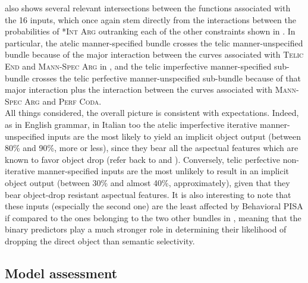  also shows several relevant intersections between the functions associated with the 16 inputs, which once again stem directly from the interactions between the probabilities of \textsc{*Int Arg} outranking each of the other constraints shown in . In particular, the atelic manner-specified bundle crosses the telic manner-unspecified bundle because of the major interaction between the curves associated with \textsc{Telic End} and \textsc{Mann-Spec Arg} in , and the telic imperfective manner-specified sub-bundle crosses the telic perfective manner-unspecified sub-bundle because of that major interaction plus the interaction between the curves associated with \textsc{Mann-Spec Arg} and \textsc{Perf Coda}.\\
All things considered, the overall picture is consistent with expectations. Indeed, as in English grammar, in Italian too the atelic imperfective iterative manner-unspecified inputs are the most likely to yield an implicit object output (between 80\% and 90\%, more or less), since they bear all the aspectual features which are known to favor object drop (refer back to  and ). Conversely, telic perfective non-iterative manner-specified inputs are the most unlikely to result in an implicit object output (between 30\% and almost 40\%, approximately), given that they bear object-drop resistant aspectual features. It is also interesting to note that these inputs (especially the second one) are the least affected by Behavioral PISA if compared to the ones belonging to the two other bundles in , meaning that the binary predictors play a much stronger role in determining their likelihood of dropping the direct object than semantic selectivity.


\subsection{Model assessment} 

